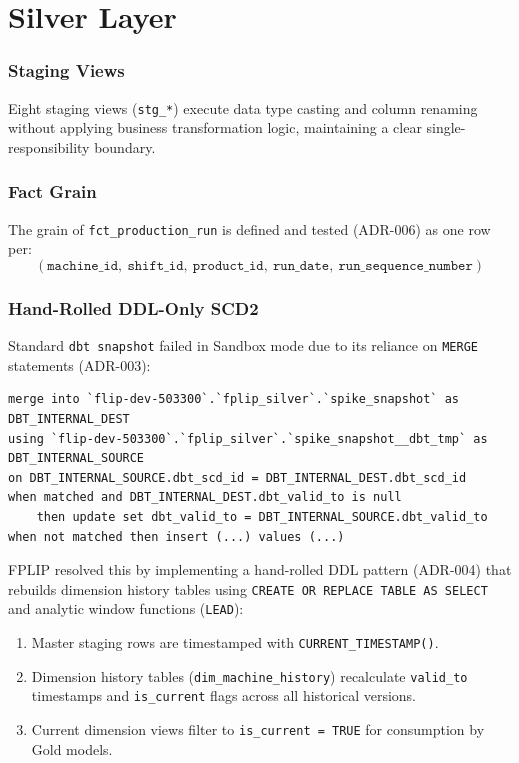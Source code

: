 \documentclass[12pt, a4paper]{report}
\begin{document}
\section{Silver Layer}
\label{sec:silver-layer}

\subsubsection{Staging Views}
Eight staging views (\texttt{stg\_*}) execute data type casting and column renaming without applying business transformation logic, maintaining a clear single-responsibility boundary.

\subsubsection{Fact Grain}
\label{sec:grain}
The grain of \texttt{fct\_production\_run} is defined and tested (ADR-006) as one row per:
\[
(\texttt{machine\_id},\ \texttt{shift\_id},\ \texttt{product\_id},\ \texttt{run\_date},\ \texttt{run\_sequence\_number})
\]

\subsubsection{Hand-Rolled DDL-Only SCD2}
\label{sec:scd2}
Standard \texttt{dbt snapshot} failed in Sandbox mode due to its reliance on \texttt{MERGE} statements (ADR-003):
\begin{lstlisting}[style=sqlstyle, caption={\texttt{MERGE} statement attempted by dbt snapshot, blocked in Sandbox}, label={lst:snapshot-merge}]
merge into `flip-dev-503300`.`fplip_silver`.`spike_snapshot` as DBT_INTERNAL_DEST
using `flip-dev-503300`.`fplip_silver`.`spike_snapshot__dbt_tmp` as DBT_INTERNAL_SOURCE
on DBT_INTERNAL_SOURCE.dbt_scd_id = DBT_INTERNAL_DEST.dbt_scd_id
when matched and DBT_INTERNAL_DEST.dbt_valid_to is null
    then update set dbt_valid_to = DBT_INTERNAL_SOURCE.dbt_valid_to
when not matched then insert (...) values (...)
\end{lstlisting}

FPLIP resolved this by implementing a hand-rolled DDL pattern (ADR-004) that rebuilds dimension history tables using \texttt{CREATE OR REPLACE TABLE AS SELECT} and analytic window functions (\texttt{LEAD}):
\begin{enumerate}
    \item Master staging rows are timestamped with \texttt{CURRENT\_TIMESTAMP()}.
    \item Dimension history tables (\texttt{dim\_machine\_history}) recalculate \texttt{valid\_to} timestamps and \texttt{is\_current} flags across all historical versions.
    \item Current dimension views filter to \texttt{is\_current = TRUE} for consumption by Gold models.
\end{enumerate}
\end{document}
